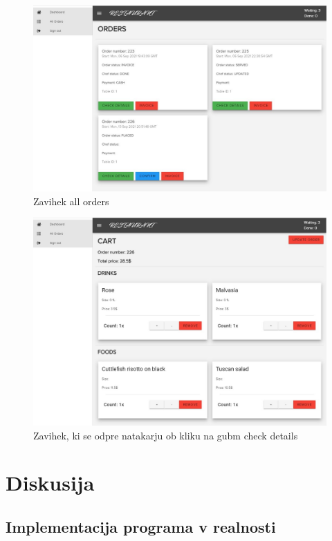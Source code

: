 \documentclass[a4paper, 12pt]{book}
\begin{document}
\begin{figure}[!htb]
\begin{center}
\includegraphics[width=13cm]{natakar_2.jpg}
\caption{Zavihek all orders}
\label{Natakar_2}
\end{center}
\end{figure}

\begin{figure}[!htb]
\begin{center}
\includegraphics[width=13cm]{natakar_3.jpg}
\caption{Zavihek, ki se odpre natakarju ob kliku na gubm check details}
\label{Natakar_3}
\end{center}
\end{figure}
\chapter {Diskusija}

\section{Implementacija programa v realnosti}
\end{document}

